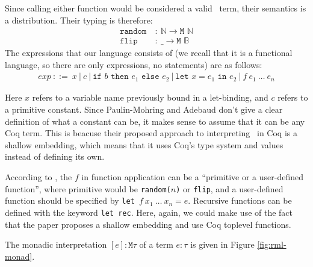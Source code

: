 \documentclass[11pt, leqno, titlepage]{article}
\theoremstyle{definition}
\begin{document}
Since calling either function would be considered a valid \rml\ term, their semantics
is a distribution. Their typing is therefore:
\begin{align*}
  \texttt{random} &~:~\mathbb{N} \to \texttt{M }\mathbb{N}\\
  \texttt{flip}   &~:~ \_ \to \texttt{M }\mathbb{B}
\end{align*}
\noindent The expressions that our language consists of (we recall that it is a functional
language, so there are only expressions, no statements) are as follows:
\begin{align*}
  exp~::= ~ x~\vert ~ c~\vert ~ \texttt{if }b\texttt{ then }e_1\texttt{ else } e_2~
  \vert ~ \texttt{let }x = e_1 \texttt{ in }e_2~\vert ~ f~e_1~\dots~e_n
\end{align*}

Here $x$ refers to a variable name previously bound in a let-binding, and $c$ refers
to a primitive constant. Since Paulin-Mohring and Adebaud don't give a clear
definition of what a constant can be, it makes sense to assume that it can be any
Coq term. This is beacuse their proposed approach to interpreting \rml\ in Coq is a
shallow embedding, which means that it uses Coq's type system and values instead of
defining its own. 

According to \cite{rml-paper}, the $f$ in function application can be a ``primitive
or a user-defined function'', where primitive would be \texttt{random($n$)} or
\texttt{flip}, and a user-defined function should be specified by \texttt{let
}$f~x_1~\dots~ x_n= e$. Recursive functions can be defined with the keyword
\texttt{let rec}. Here, again, we could make use of the fact that the paper proposes
a shallow embedding and use Coq toplevel functions.

The monadic interpretation $[e]:\texttt{M}\tau$ of a term $e:\tau$ is given in
Figure \ref{fig:rml-monad}.
\end{document}
